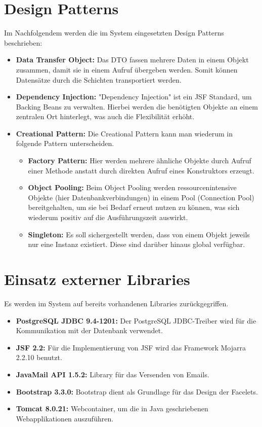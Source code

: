 \section{Design Patterns}
Im Nachfolgendem werden die im System eingesetzten Design Patterns beschrieben:
	\begin{itemize}
		\item \textbf{Data Transfer Object:} Das DTO fassen mehrere Daten in einem Objekt zusammen, damit sie in einem Aufruf übergeben werden. Somit können Datensätze durch die Schichten transportiert werden.
		\item \textbf{Dependency Injection:} "Dependency Injection" ist ein JSF Standard, um Backing Beans zu verwalten. Hierbei werden die benötigten Objekte an einem zentralen Ort hinterlegt, was auch die Flexibilität erhöht.  
		\item \textbf{Creational Pattern:} Die Creational Pattern kann man wiederum in folgende Pattern unterscheiden.
			\begin{itemize}
				\item \textbf{Factory Pattern:} Hier werden mehrere ähnliche Objekte durch Aufruf einer Methode anstatt durch direkten Aufruf eines Konstruktors erzeugt.
				\item \textbf{Object Pooling:} Beim Object Pooling werden ressourcenintensive Objekte (hier Datenbankverbindungen) in einem Pool (Connection Pool) bereitgehalten, um sie bei Bedarf erneut nutzen zu können, was sich wiederum positiv auf die Ausführungszeit auswirkt.
				\item \textbf{Singleton:} Es soll sichergestellt werden, dass von einem Objekt jeweils nur eine Instanz existiert. Diese sind darüber hinaus global verfügbar.  
			\end{itemize}
	\end{itemize}
\section{Einsatz externer Libraries}
Es werden im System auf bereits vorhandenen Libraries zurückgegriffen.
	\begin{itemize}
		\item \textbf{PostgreSQL JDBC 9.4-1201:} Der PostgreSQL JDBC-Treiber wird für die Kommunikation mit der Datenbank verwendet.
		\item \textbf{JSF 2.2:} Für die Implementierung von JSF wird das Framework Mojarra 2.2.10 benutzt.
		\item \textbf{JavaMail API 1.5.2:} Library für das Versenden von Emails.
		\item \textbf{Bootstrap 3.3.0:} Bootstrap dient als Grundlage für das Design der Facelets.
		\item \textbf{Tomcat 8.0.21:} Webcontainer, um die in Java geschriebenen Webapplikationen auszuführen.  
	\end{itemize}
